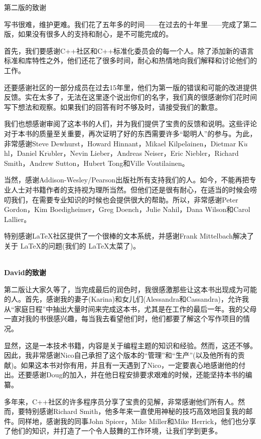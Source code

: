 \begin{flushright}
 第二版的致谢
\end{flushright}

写书很难，维护更难。我们花了五年多的时间——在过去的十年里——完成了第二版，如果没有很多人的支持和耐心，是不可能完成的。

首先，我们要感谢C++社区和C++标准化委员会的每一个人。除了添加新的语言标准和库特性之外，他们还花了很多时间，耐心和热情地向我们解释和讨论他们的工作。

还要感谢社区的一部分成员在过去15年里，他们为第一版的错误和可能的改进提供反馈。实在太多了，无法在这里逐个说出你们的名字，我们真的很感谢你们花时间写下想法和观察。如果我们的回答有时不够及时，请接受我们的歉意。

我们也想感谢审阅了这本书的人们，并为我们提供了宝贵的反馈和说明。这些评论对于本书的质量至关重要，再次证明了好的东西需要许多“聪明人”的参与。为此，非常感谢Steve Dewhurst，Howard Hinnant，Mikael Kilpel$\ddot{a}$inen，Dietmar K$\ddot{u}$hl，Daniel Kr$\ddot{u}$bler，Nevin Lieber，Andreas Neiser，Eric Niebler，Richard Smith，Andrew Sutton，Hubert Tong和Ville Voutilainen。

当然，感谢Addison-Wesley/Pearson出版社所有支持我们的人。如今，不能再把专业人士对书籍作者的支持视为理所当然。但他们还是很有耐心，在适当的时候会唠叨我们，在需要专业知识的时候也会提供很大的帮助。所以，非常感谢Peter Gordon，Kim Boedigheimer，Greg Doench，Julie Nahil，Dana
Wilson和Carol Lallier。

特别感谢LaTeX社区提供了一个很棒的文本系统，并感谢Frank Mittelbach解决了关于 \LaTeX 的问题(我们的 \LaTeX 太菜了)。

\hspace*{\fill} \\ %
\noindent\textbf{David的致谢}

第二版让大家久等了，当完成最后的润色时，我很感激那些让这本书出现成为可能的人。首先，感谢我的妻子(Karina)和女儿们(Alessandra和Cassandra)，允许我从“家庭日程”中抽出大量时间来完成这本书，尤其是在工作的最后一年。我的父母一直对我的书很感兴趣，每当我去看望他们时，他们都要了解这个写作项目的情况。

显然，这是一本技术书籍，内容是关于编程主题的知识和经验。然而，这还不够。因此，我非常感谢Nico自己承担了这个版本的“管理”和“生产”(以及他所有的贡献)。如果这本书对你有用，并且有一天遇到了Nico，一定要衷心地感谢他的付出。还要感谢Doug的加入，并在他日程安排要求艰难的时候，还能坚持本书的编纂。

多年来，C++社区的许多程序员分享了宝贵的见解，非常感谢他们所有人。然而，要特别感谢Richard Smith，他多年来一直使用神秘的技巧高效地回复我的邮件。同样地，感谢我的同事John Spicer，Mike Miller和Mike Herrick，他们也分享了他们的知识，并打造了一个令人鼓舞的工作环境，让我们学到更多。

